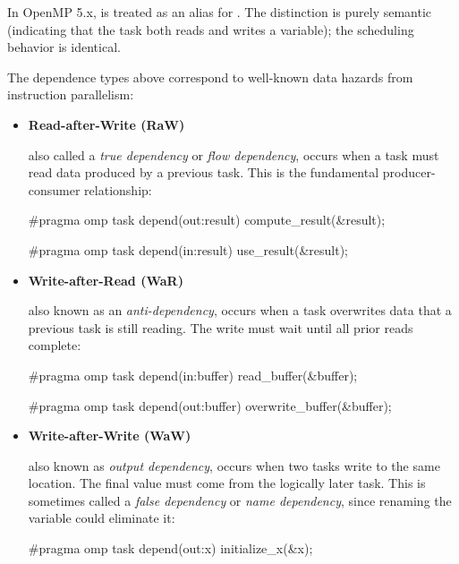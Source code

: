 \vspace{-0.2em}

\begin{observationblock}
In OpenMP 5.x,  is treated as an alias for . The distinction is purely semantic (indicating that the task both reads and writes a variable); the scheduling behavior is identical.
\end{observationblock}


The dependence types above correspond to well-known data hazards from instruction parallelism:

\begin{itemize}
\item \textbf{Read-after-Write (RaW)}

also called a \emph{true dependency} or \emph{flow dependency}, occurs when a task must read data produced by a previous task. This is the fundamental producer-consumer relationship:

\begin{codeblock}[language=C]
#pragma omp task depend(out:result)
compute_result(&result);

#pragma omp task depend(in:result)
use_result(&result);
\end{codeblock}

\item \textbf{Write-after-Read (WaR)}

also known as an \emph{anti-dependency}, occurs when a task overwrites data that a previous task is still reading. The write must wait until all prior reads complete:

\begin{codeblock}[language=C]
#pragma omp task depend(in:buffer)
read_buffer(&buffer);

#pragma omp task depend(out:buffer)
overwrite_buffer(&buffer);
\end{codeblock}

\item \textbf{Write-after-Write (WaW)}

also known as \emph{output dependency}, occurs when two tasks write to the same location. The final value must come from the logically later task. This is sometimes called a \emph{false dependency} or \emph{name dependency}, since renaming the variable could eliminate it:

\begin{codeblock}[language=C]
#pragma omp task depend(out:x)
initialize_x(&x);


\end{codeblock}
\end{itemize}
